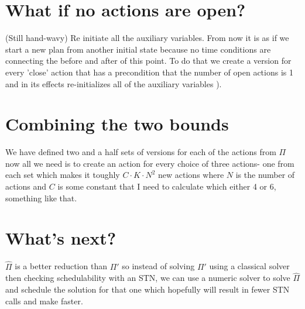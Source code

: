 \documentclass{article}
\begin{document}
\section{What if no actions are open?}
(Still hand-wavy)
Re initiate all the auxiliary variables. From now it is as if we start a new plan from another initial state because no time conditions are connecting the before and after of this point. To do that we create a version for every 'close' action that has a precondition that the number of open actions is 1 and in its effects re-initializes all of the auxiliary variables ). 

\section{Combining the two bounds}
We have defined two and a half sets of versions for each of the actions from $\Pi$ now all we need is to create an action for every choice of three actions- one from each set which makes it toughly $C\cdot K\cdot N^2$ new actions where $N$ is the number of actions and $C$ is some constant that I need to calculate which either 4 or 6, something like that.

\section{What's next?}
$\hat \Pi$ is a better reduction than $\Pi'$ so instead of solving $\Pi'$ using a classical solver then checking schedulability with an STN, we can use a numeric solver to solve $\hat \Pi$ and schedule the solution for that one which hopefully will result in fewer STN calls and make faster.
\end{document}
